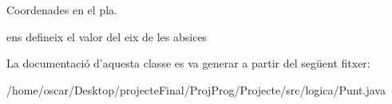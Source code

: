 Coordenades en el pla. 

ens defineix el valor del eix de les absices 

La documentació d'aquesta classe es va generar a partir del següent fitxer\+:\begin{DoxyCompactItemize}
\item 
/home/oscar/\+Desktop/projecte\+Final/\+Proj\+Prog/\+Projecte/src/logica/Punt.\+java\end{DoxyCompactItemize}

